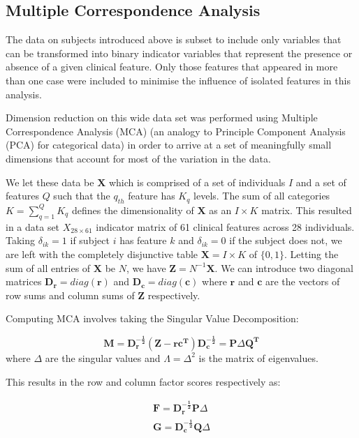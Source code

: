 \documentclass[
  authoryear,
  preprint,
  3p]{elsarticle}
\begin{document}
\hypertarget{multiple-correspondence-analysis}{%
\subsection{Multiple Correspondence
Analysis}\label{multiple-correspondence-analysis}}

The data on subjects introduced above is subset to include only
variables that can be transformed into binary indicator variables that
represent the presence or absence of a given clinical feature. Only
those features that appeared in more than one case were included to
minimise the influence of isolated features in this analysis.

Dimension reduction on this wide data set was performed using Multiple
Correspondence Analysis (MCA) (an analogy to Principle Component
Analysis (PCA) for categorical data) \citep{le2010multiple} in order to
arrive at a set of meaningfully small dimensions that account for most
of the variation in the data.

We let these data be \(\mathbf{X}\) which is comprised of a set of
individuals \(I\) and a set of features \(Q\) such that the \(q_{th}\)
feature has \(K_q\) levels. The sum of all categories
\(K = \sum_{q=1}^{Q}K_q\) defines the dimensionality of \(\mathbf{X}\)
as an \(I\times K\) matrix. This resulted in a data set
\(X_{28 \times 61}\) indicator matrix of 61 clinical features across 28
individuals. Taking \(\delta_{ik} = 1\) if subject \(i\) has feature
\(k\) and \(\delta_{ik} = 0\) if the subject does not, we are left with
the completely disjunctive table \(\mathbf{X} = I\times K\) of
\(\{0,1\}\). Letting the sum of all entries of \(\mathbf{X}\) be \(N\),
we have \(\mathbf{Z} = N^{-1}\mathbf{X}\). We can introduce two diagonal
matrices \(\mathbf{D_r} = diag(\mathbf{r})\) and
\(\mathbf{D_c} = diag(\mathbf{c})\) where \(\mathbf{r}\) and
\(\mathbf{c}\) are the vectors of row sums and column sums of
\(\mathbf{Z}\) respectively.

Computing MCA involves taking the Singular Value Decomposition:

\[
\mathbf{M = D_r^{-\frac{1}{2}}(Z-rc^T)D_c^{-\frac{1}{2}}} = \mathbf{P}\Delta\mathbf{Q^T}
\] where \(\Delta\) are the singular values and \(\Lambda = \Delta^2\)
is the matrix of eigenvalues.

This results in the row and column factor scores respectively as:

\[
\begin{split}
\mathbf{F} = \mathbf{D_r^{-\frac{1}{2}}P}\Delta \\
\mathbf{G = D_c^{-\frac{1}{2}}Q}\Delta
\end{split}
\]
\end{document}
